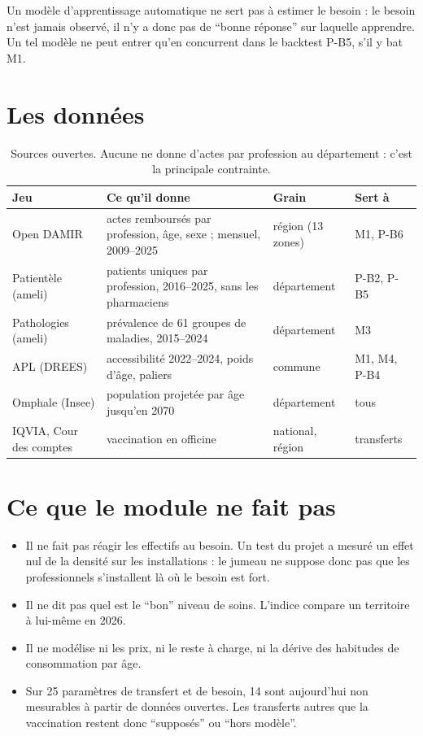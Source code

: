 \documentclass[11pt]{article}
\begin{document}
Un modèle d'apprentissage automatique ne sert pas à estimer le besoin : le besoin n'est jamais observé, il n'y a donc
pas de \enquote{bonne réponse} sur laquelle apprendre. Un tel modèle ne peut entrer qu'en concurrent dans le backtest
P-B5, s'il y bat M1.

\section{Les données}
\begin{table}[h]
\centering\small
\begin{tabularx}{\linewidth}{@{}l X l l@{}}
\toprule
\textbf{Jeu} & \textbf{Ce qu'il donne} & \textbf{Grain} & \textbf{Sert à} \\
\midrule
Open DAMIR & actes remboursés par profession, âge, sexe ; mensuel, 2009--2025 & région (13 zones) & M1, P-B6 \\
Patientèle (ameli) & patients uniques par profession, 2016--2025, sans les pharmaciens & département & P-B2, P-B5 \\
Pathologies (ameli) & prévalence de 61 groupes de maladies, 2015--2024 & département & M3 \\
APL (DREES) & accessibilité 2022--2024, poids d'âge, paliers & commune & M1, M4, P-B4 \\
Omphale (Insee) & population projetée par âge jusqu'en 2070 & département & tous \\
IQVIA, Cour des comptes & vaccination en officine & national, région & transferts \\
\bottomrule
\end{tabularx}
\caption{Sources ouvertes. Aucune ne donne d'actes par profession au département : c'est la principale contrainte.}
\end{table}

\section{Ce que le module ne fait pas}
\begin{itemize}
  \item Il ne fait pas réagir les effectifs au besoin. Un test du projet a mesuré un effet nul de la densité sur les
    installations : le jumeau ne suppose donc pas que les professionnels s'installent là où le besoin est fort.
  \item Il ne dit pas quel est le \enquote{bon} niveau de soins. L'indice compare un territoire à lui-même en 2026.
  \item Il ne modélise ni les prix, ni le reste à charge, ni la dérive des habitudes de consommation par âge.
  \item Sur 25 paramètres de transfert et de besoin, 14 sont aujourd'hui non mesurables à partir de données ouvertes.
    Les transferts autres que la vaccination restent donc \enquote{supposés} ou \enquote{hors modèle}.
\end{itemize}
\end{document}
